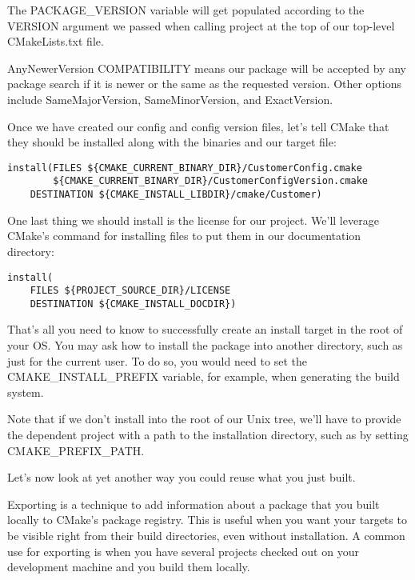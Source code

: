 The PACKAGE\_VERSION variable will get populated according to the VERSION argument we passed when calling project at the top of our top-level CMakeLists.txt file.

AnyNewerVersion COMPATIBILITY means our package will be accepted by any package search if it is newer or the same as the requested version. Other options include SameMajorVersion, SameMinorVersion, and ExactVersion.

Once we have created our config and config version files, let's tell CMake that they should be installed along with the binaries and our target file:

\begin{lstlisting}[style=styleCMake]
install(FILES ${CMAKE_CURRENT_BINARY_DIR}/CustomerConfig.cmake
		${CMAKE_CURRENT_BINARY_DIR}/CustomerConfigVersion.cmake
	DESTINATION ${CMAKE_INSTALL_LIBDIR}/cmake/Customer)
\end{lstlisting}

One last thing we should install is the license for our project. We'll leverage CMake's command for installing files to put them in our documentation directory:

\begin{lstlisting}[style=styleCMake]
install(
	FILES ${PROJECT_SOURCE_DIR}/LICENSE
	DESTINATION ${CMAKE_INSTALL_DOCDIR})
\end{lstlisting}

That's all you need to know to successfully create an install target in the root of your OS. You may ask how to install the package into another directory, such as just for the current user. To do so, you would need to set the CMAKE\_INSTALL\_PREFIX variable, for example, when generating the build system.

Note that if we don't install into the root of our Unix tree, we'll have to provide the dependent project with a path to the installation directory, such as by setting CMAKE\_PREFIX\_PATH.

Let's now look at yet another way you could reuse what you just built.


Exporting is a technique to add information about a package that you built locally to CMake's package registry. This is useful when you want your targets to be visible right from their build directories, even without installation. A common use for exporting is when you have several projects checked out on your development machine and you build them locally.

